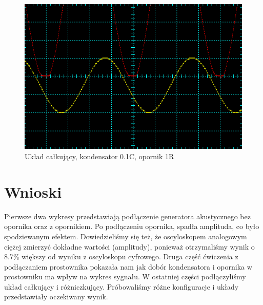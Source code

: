 \documentclass[a4paper,11pt]{article}
\begin{document}
\begin{figure}[ht]
 \begin{center}
  \includegraphics[width=12cm]{calkujacy_1R_01C}
 \end{center}
 \caption{Układ całkujący, kondensator 0.1C, opornik 1R}
\end{figure}


\section{Wnioski}
Pierwsze dwa wykresy przedstawiają podłączenie generatora akustycznego bez opornika oraz z opornikiem. Po podłączeniu opornika, spadła amplituda, co było spodziewanym efektem. Dowiedzieliśmy się też, że oscyloskopem analogowym ciężej zmierzyć dokładne wartości (amplitudy), ponieważ otrzymaliśmy wynik o 8.7\% większy od wyniku z oscyloskopu cyfrowego.
Druga część ćwiczenia z podłączaniem prostownika pokazała nam jak dobór kondensatora i opornika w prostowniku ma wpływ na wykres sygnału.
W ostatniej części podłączyliśmy układ całkujący i różniczkujący. Próbowaliśmy różne konfiguracje i układy przedstawiały oczekiwany wynik.
\end{document}
